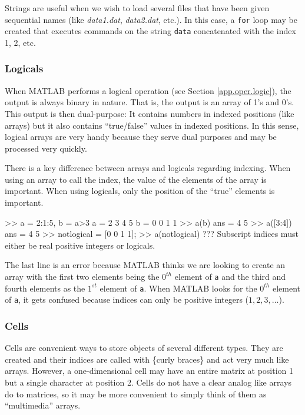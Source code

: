 \par
Strings are useful when we wish to load several files that have been given sequential names (like \textit{data1.dat}, \textit{data2.dat}, etc.).  In this case, a \verb=for= loop may be created that executes commands on the string \verb=data= concatenated with the index 1, 2, etc.

\subsubsection{Logicals}
When MATLAB performs a logical operation (see Section \ref{app.oper.logic}), the output is always binary in nature.  That is, the output is an array of 1's and 0's.  This output is then dual-purpose:  It contains numbers in indexed positions (like arrays) but it also contains ``true/false'' values in indexed positions.  In this sense, logical arrays are very handy because they serve dual purposes and may be processed very quickly.
\par
There is a key difference between arrays and logicals regarding indexing.  When using an array to call the index, the value of the elements of the array is important.  When using logicals, only the position of the ``true'' elements is important.

\begin{codex}
>> a = 2:1:5, b = a>3
a =
    2   3   4   5
b =
    0   0   1   1
>> a(b)
ans =
    4   5
>> a([3:4])
ans =
    4   5
>> notlogical = [0 0 1 1];
>> a(notlogical)
??? Subscript indices must either be real positive integers
    or logicals.
\end{codex}

\par
The last line is an error because MATLAB thinks we are looking to create an array with the first two elements being the $0^{th}$ element of \verb=a= and the third and fourth elements as the $1^{st}$ element of \verb=a=.  When MATLAB looks for the $0^{th}$ element of \verb=a=, it gets confused because indices can only be positive integers ($1,2,3,\ldots$).

\subsubsection{Cells}
Cells are convenient ways to store objects of several different types.  They are created and their indices are called with \{curly braces\} and act very much like arrays.  However, a one-dimensional cell may have an entire matrix at position 1 but a single character at position 2.  Cells do not have a clear analog like arrays do to matrices, so it may be more convenient to simply think of them as ``multimedia'' arrays.

